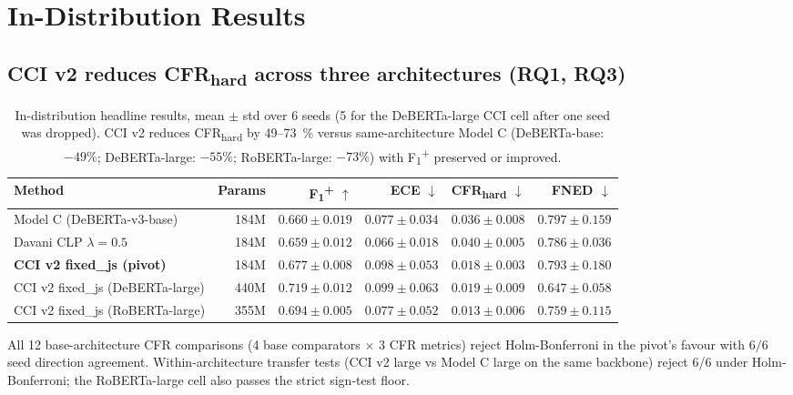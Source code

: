 \documentclass[10pt,a4paper]{article}
\begin{document}
\section{In-Distribution Results}
\label{sec:results-id}

\subsection{CCI v2 reduces CFR\textsubscript{hard} across three architectures (RQ1, RQ3)}

\begin{table}[h]
\centering
\small
\begin{tabular}{l r r r r r}
\toprule
Method & Params & F\textsubscript{1}\textsuperscript{+} $\uparrow$ & ECE $\downarrow$ & CFR\textsubscript{hard} $\downarrow$ & FNED $\downarrow$ \\
\midrule
Model C (DeBERTa-v3-base)            & 184M & $0.660 \pm 0.019$ & $0.077 \pm 0.034$ & $0.036 \pm 0.008$ & $0.797 \pm 0.159$ \\
Davani CLP $\lambda{=}0.5$           & 184M & $0.659 \pm 0.012$ & $0.066 \pm 0.018$ & $0.040 \pm 0.005$ & $0.786 \pm 0.036$ \\
\textbf{CCI v2 fixed\_js (pivot)}    & 184M & $\mathbf{0.677 \pm 0.008}$ & $0.098 \pm 0.053$ & $\mathbf{0.018 \pm 0.003}$ & $0.793 \pm 0.180$ \\
CCI v2 fixed\_js (DeBERTa-large)     & 440M & $\mathbf{0.719 \pm 0.012}$ & $0.099 \pm 0.063$ & $0.019 \pm 0.009$ & $0.647 \pm 0.058$ \\
CCI v2 fixed\_js (RoBERTa-large)     & 355M & $0.694 \pm 0.005$ & $0.077 \pm 0.052$ & $\mathbf{0.013 \pm 0.006}$ & $0.759 \pm 0.115$ \\
\bottomrule
\end{tabular}
\caption{In-distribution headline results, mean $\pm$ std over 6 seeds (5 for the
DeBERTa-large CCI cell after one seed was dropped). CCI v2 reduces
CFR\textsubscript{hard} by 49--73~\% versus same-architecture Model C
(DeBERTa-base: $-49\%$; DeBERTa-large: $-55\%$; RoBERTa-large: $-73\%$) with
F\textsubscript{1}\textsuperscript{+} preserved or improved.}
\label{tab:main}
\end{table}

All 12 base-architecture CFR comparisons (4 base comparators $\times$ 3 CFR
metrics) reject Holm-Bonferroni in the pivot's favour with $6/6$ seed
direction agreement. Within-architecture transfer tests (CCI v2 large vs
Model C large on the same backbone) reject 6/6 under Holm-Bonferroni; the
RoBERTa-large cell also passes the strict sign-test floor.
\end{document}
